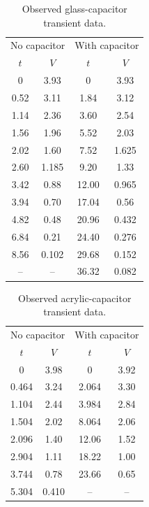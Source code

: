 \documentclass[letterpaper,12pt]{article}
\begin{document}
\begin{table}[H]
    \centering
    \caption{Observed glass-capacitor transient data.}
    \begin{tabular}{cccc}
        \toprule
        \multicolumn{2}{c}{No capacitor} & \multicolumn{2}{c}{With capacitor} \\
        $t$ & $V$ & $t$ & $V$ \\
        \midrule
        0 & 3.93 & 0 & 3.93 \\
        0.52 & 3.11 & 1.84 & 3.12 \\
        1.14 & 2.36 & 3.60 & 2.54 \\
        1.56 & 1.96 & 5.52 & 2.03 \\
        2.02 & 1.60 & 7.52 & 1.625 \\
        2.60 & 1.185 & 9.20 & 1.33 \\
        3.42 & 0.88 & 12.00 & 0.965 \\
        3.94 & 0.70 & 17.04 & 0.56 \\
        4.82 & 0.48 & 20.96 & 0.432 \\
        6.84 & 0.21 & 24.40 & 0.276 \\
        8.56 & 0.102 & 29.68 & 0.152 \\
        -- & -- & 36.32 & 0.082 \\
        \bottomrule
    \end{tabular}
\end{table}

\begin{table}[H]
    \centering
    \caption{Observed acrylic-capacitor transient data.}
    \begin{tabular}{cccc}
        \toprule
        \multicolumn{2}{c}{No capacitor} & \multicolumn{2}{c}{With capacitor} \\
        $t$ & $V$ & $t$ & $V$ \\
        \midrule
        0 & 3.98 & 0 & 3.92 \\
        0.464 & 3.24 & 2.064 & 3.30 \\
        1.104 & 2.44 & 3.984 & 2.84 \\
        1.504 & 2.02 & 8.064 & 2.06 \\
        2.096 & 1.40 & 12.06 & 1.52 \\
        2.904 & 1.11 & 18.22 & 1.00 \\
        3.744 & 0.78 & 23.66 & 0.65 \\
        5.304 & 0.410 & -- & -- \\
        \bottomrule
    \end{tabular}
\end{table}
\end{document}
